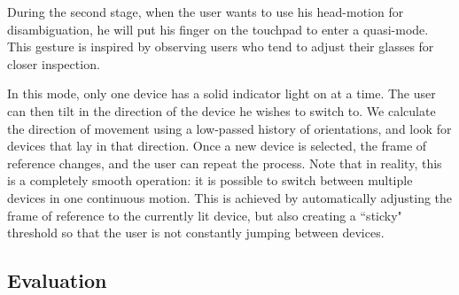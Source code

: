 During the second stage, when the user wants to use his head-motion for disambiguation, he will put his finger on the touchpad to enter a quasi-mode.  This gesture is inspired by observing users who tend to adjust their glasses for closer inspection.

In this mode, only one device has a solid indicator light on at a time. The user can then tilt in the direction of the device he wishes to switch to. We calculate the direction of movement using a low-passed history of orientations, and look for devices that lay in that direction. Once a new device is selected, the frame of reference changes, and the user can repeat the process. Note that in reality, this is a completely smooth operation: it is possible to switch between multiple devices in one continuous motion. This is achieved by automatically adjusting the frame of reference to the currently lit device, but also creating a ``sticky" threshold so that the user is not constantly jumping between devices.


\subsection{Evaluation}





